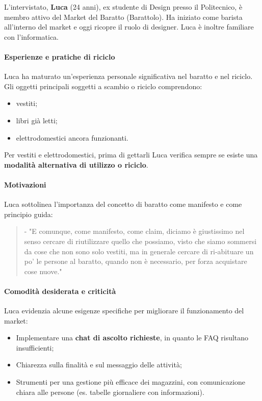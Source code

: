 \documentclass[12pt,a4paper]{article}
\begin{document}
L’intervistato, \textbf{Luca} (24 anni), ex studente di Design presso il Politecnico, è membro attivo del Market del Baratto (Barattolo). Ha iniziato come barista all’interno del market e oggi ricopre il ruolo di designer. Luca è inoltre familiare con l’informatica.  

\paragraph{Esperienze e pratiche di riciclo}

Luca ha maturato un’esperienza personale significativa nel baratto e nel riciclo. Gli oggetti principali soggetti a scambio o riciclo comprendono:
\begin{itemize}
  \item vestiti;
  \item libri già letti;
  \item elettrodomestici ancora funzionanti.
\end{itemize}
Per vestiti e elettrodomestici, prima di gettarli Luca verifica sempre se esiste una \textbf{modalità alternativa di utilizzo o riciclo}.  

\paragraph{Motivazioni}

Luca sottolinea l’importanza del concetto di baratto come manifesto e come principio guida:  

\begin{quote}
- "E comunque, come manifesto, come claim, diciamo è giustissimo nel senso cercare di riutilizzare quello che possiamo, visto che siamo sommersi da cose che non sono solo vestiti, ma in generale cercare di ri-abituare un po' le persone al baratto, quando non è necessario, per forza acquistare cose nuove."
\end{quote}

\paragraph{Comodità desiderata e criticità}

Luca evidenzia alcune esigenze specifiche per migliorare il funzionamento del market:
\begin{itemize}
  \item Implementare una \textbf{chat di ascolto richieste}, in quanto le FAQ risultano insufficienti;  
  \item Chiarezza sulla finalità e sul messaggio delle attività;  
  \item Strumenti per una gestione più efficace dei magazzini, con comunicazione chiara alle persone (es. tabelle giornaliere con informazioni).  
\end{itemize}
\end{document}
